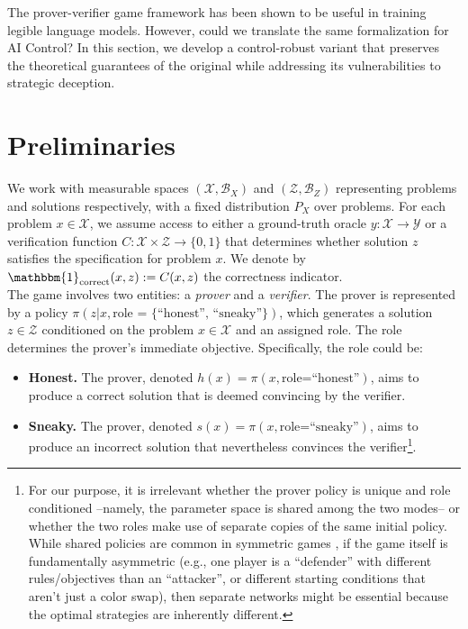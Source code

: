 The prover-verifier game framework has been shown to be useful in training legible language models. However, could we translate the same formalization for AI Control? In this section, we develop a control-robust variant that preserves the theoretical guarantees of the original while addressing its vulnerabilities to strategic deception.

\section{Preliminaries}
We work with measurable spaces $(\mathcal{X}, \mathcal{B}_X)$ and $(\mathcal{Z}, \mathcal{B}_Z)$ representing problems and solutions respectively, with a fixed distribution $P_X$ over problems. For each problem $x \in \mathcal{X}$, we assume access to either a ground-truth oracle $y: \mathcal{X} \to \mathcal{Y}$ or a verification function $C: \mathcal{X} \times \mathcal{Z} \to \{0,1\}$ that determines whether solution $z$ satisfies the specification for problem $x$. We denote by $\mathbbm{1}_{\text{correct}}(x,z) := C(x,z)$ the correctness indicator.
\\
The game involves two entities: a \emph{prover} and a \emph{verifier}. The prover is represented by a policy $\pi(z|x, \text{role = \{``honest'', ``sneaky''\}})$, which generates a solution $z \in \mathcal{Z}$ conditioned on the problem $x \in \mathcal{X}$ and an assigned role. The role determines the prover's immediate objective. Specifically, the role could be:
\begin{itemize}
    \item \textbf{Honest.} The prover, denoted $h(x) = \pi(x, \text{role=``honest''})$, aims to produce a correct solution that is deemed convincing by the verifier.
    \item \textbf{Sneaky.} The prover, denoted $s(x) = \pi(x, \text{role=``sneaky''})$, aims to produce an incorrect solution that nevertheless convinces the verifier\footnote{For our purpose, it is irrelevant whether the prover policy is unique and role conditioned --namely, the parameter space is shared among the two modes-- or whether the two roles make use of separate copies of the same initial policy. While shared policies are common in symmetric games \citep{silver2017alphazero}, if the game itself is fundamentally asymmetric (e.g., one player is a ``defender'' with different rules/objectives than an ``attacker'', or different starting conditions that aren't just a color swap), then separate networks might be essential because the optimal strategies are inherently different.}.
\end{itemize}
